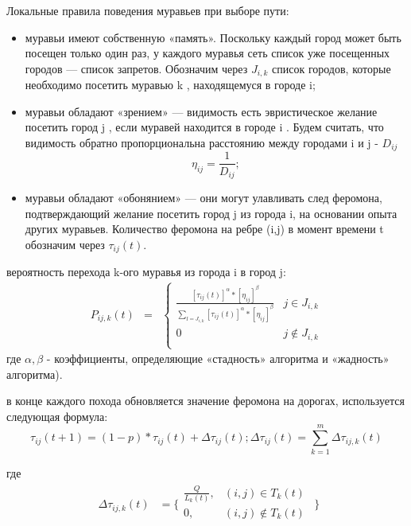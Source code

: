 \documentclass[a4paper,12pt]{article}
\begin{document}
    Локальные правила поведения муравьев при выборе пути:
    \begin{itemize}
    	\item муравьи имеют собственную «память». Поскольку каждый город может
    	быть посещен только один раз, у каждого муравья сеть список уже посещенных городов — список запретов. Обозначим через $J_{i,k}$
    	список городов, которые необходимо посетить муравью k , находящемуся в городе i;
    	\item муравьи обладают «зрением» — видимость есть эвристическое желание
    	посетить город j , если муравей находится в городе i . Будем считать, что видимость обратно пропорциональна расстоянию между городами i и j - $D_{ij}$
    	\begin{equation}
    		\eta_{ij} = \frac{1}{D_{ij}};
    	\end{equation}
    	\item муравьи обладают «обонянием» — они могут улавливать след феромона,
    	подтверждающий желание посетить город j из города i, на основании опыта
    	других муравьев. Количество феромона на ребре (i,j) в момент времени t обозначим через $\tau_{ij}(t)$.
    \end{itemize}

	вероятность перехода k-ого муравья из города i в город j:
	\begin{equation}
	\begin{matrix}
	P_{ij,k}(t) & = 
	& \left\{
	\begin{matrix}
	\frac{[\tau_{ij}(t)]^\alpha * [\eta_{ij}]^\beta}{\sum\limits_{l = J_{i,k}} [\tau_{ij}(t)]^\alpha * [\eta_{ij}]^\beta }   & j \in J_{i,k} \\
	0 & j \notin J_{i,k} \\
	\end{matrix} \right. 
	\end{matrix}
	\end{equation}
	где $\alpha, \beta$ - коэффициенты, определяющие «стадность» алгоритма и «жадность» алгоритма).
	
	в конце каждого похода обновляется значение феромона на дорогах, используется следующая формула:
	\begin{equation}
	\tau_{ij}(t+1) = (1-p)*\tau_{ij}(t) + \Delta\tau_{ij}(t); \Delta\tau_{ij}(t) = \sum\limits_{k = 1}^{m} \Delta\tau_{ij,k}(t)
	\end{equation}
	
	где 
	\begin{equation}
	\begin{matrix}
	\Delta\tau_{ij,k}(t) & = \{
	\begin{matrix}
	\frac{Q}{L_k(t)}, & (i,j) \in T_k(t) \\
	0, & (i,j) \notin T_k(t) \\
	\end{matrix}
	\end{matrix}\}
	\end{equation}
	
\end{document}
